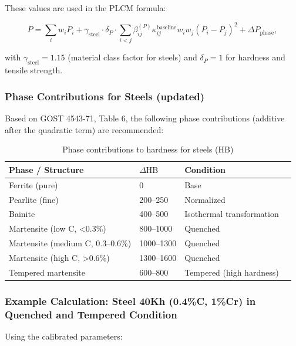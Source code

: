 \documentclass[12pt,a4paper]{article}
\begin{document}
	These values are used in the PLCM formula:
	
	\[
	P = \sum_i w_i P_i + \gamma_{\text{steel}} \cdot \delta_P \cdot \sum_{i<j} \beta_{ij}^{(P)} \kappa_{ij}^{\text{baseline}} w_i w_j (P_i - P_j)^2 + \Delta P_{\text{phase}},
	\]
	
	with $\gamma_{\text{steel}} = 1.15$ (material class factor for steels) and $\delta_P = 1$ for hardness and tensile strength.
	
	\subsubsection{Phase Contributions for Steels (updated)}
	
	Based on GOST 4543-71, Table 6, the following phase contributions (additive after the quadratic term) are recommended:
	
	\begin{longtable}{p{3.5cm} p{3.0cm} p{3.0cm} p{4cm}}
		\caption{Phase contributions to hardness for steels (HB)}\label{tab:steel_phase_contrib_gost4543}\\
		\toprule
		\textbf{Phase / Structure} & $\Delta\text{HB}$ & \textbf{Condition} \\
		\midrule
		Ferrite (pure) & 0 & Base \\
		Pearlite (fine) & 200–250 & Normalized \\
		Bainite & 400–500 & Isothermal transformation \\
		Martensite (low C, <0.3\%) & 800–1000 & Quenched \\
		Martensite (medium C, 0.3–0.6\%) & 1000–1300 & Quenched \\
		Martensite (high C, >0.6\%) & 1300–1600 & Quenched \\
		Tempered martensite & 600–800 & Tempered (high hardness) \\
		\bottomrule
	\end{longtable}
	
	\subsubsection{Example Calculation: Steel 40Kh (0.4\%C, 1\%Cr) in Quenched and Tempered Condition}
	
	Using the calibrated parameters:
	
\end{document}
